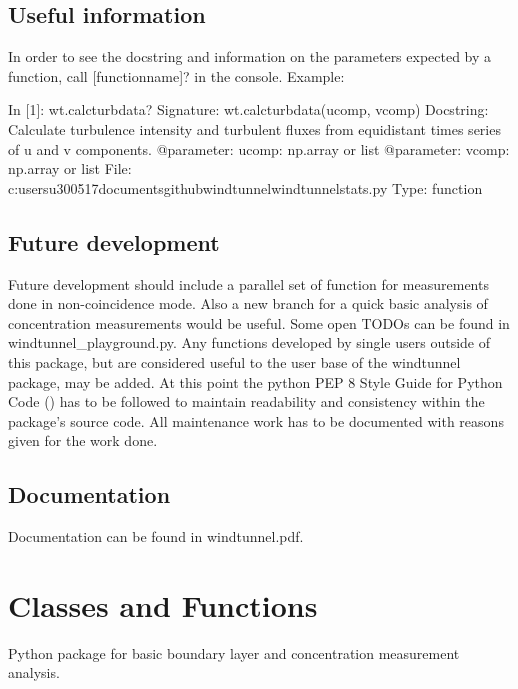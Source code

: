 \documentclass[letterpaper,10pt,english]{sphinxmanual}
\begin{document}
\section{Useful information}
\label{\detokenize{readme_link:useful-information}}
In order to see the docstring and information on the parameters expected by a function, call {[}functionname{]}? in the console. Example:

%
\begin{sphinxVerbatim}[commandchars=\\\{\}]
In [1]: wt.calc\PYGZus{}turb\PYGZus{}data?
Signature: wt.calc\PYGZus{}turb\PYGZus{}data(u\PYGZus{}comp, v\PYGZus{}comp)
Docstring:
Calculate turbulence intensity and turbulent fluxes from equidistant
times series of u and v components.
@parameter: u\PYGZus{}comp: np.array or list
@parameter: v\PYGZus{}comp: np.array or list
File:      c:\PYGZbs{}users\PYGZbs{}u300517\PYGZbs{}documents\PYGZbs{}github\PYGZbs{}windtunnel\PYGZbs{}windtunnel\PYGZbs{}stats.py
Type:      function
\end{sphinxVerbatim}


\section{Future development}
\label{\detokenize{readme_link:future-development}}
Future development should include a parallel set of function for measurements done in non-coincidence mode. Also a new branch for a quick basic analysis of concentration measurements would be useful. Some open TODOs can be found in windtunnel\_playground.py. Any functions developed by single users outside of this package, but are considered useful to the user base of the windtunnel package, may be added. At this point the python PEP 8 \textendash{} Style Guide for Python Code () has to be followed to maintain readability and consistency within the package’s source code. All maintenance work has to be documented with reasons given for the work done.


\section{Documentation}
\label{\detokenize{readme_link:documentation}}
Documentation can be found in windtunnel.pdf.


\chapter{Classes and Functions}
\label{\detokenize{index:classes-and-functions}}\label{\detokenize{index:module-windtunnel}}
Python package for basic boundary layer and concentration measurement analysis.
\end{document}
